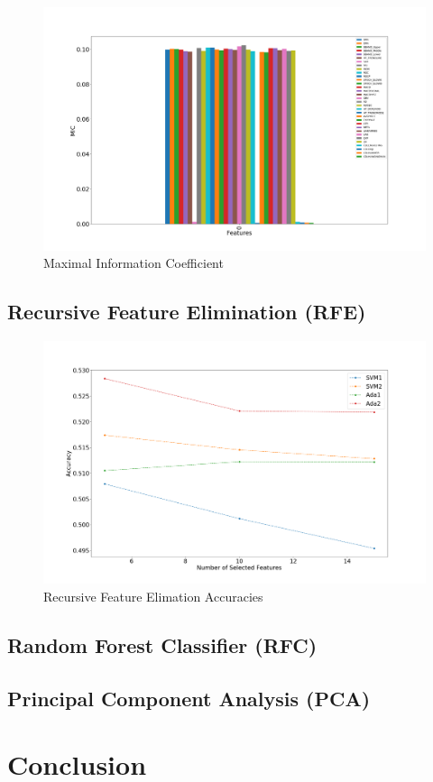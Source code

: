\documentclass{article}\raggedbottom
\begin{document}
\begin{figure}[H]
	\centering
	\includegraphics[width=\linewidth]{data/MICT1.png}
	\caption{Maximal Information Coefficient}
	\label{fig:MIC}
\end{figure}

\subsection{Recursive Feature Elimination (RFE)}


\begin{figure}[h!]
	\centering
	\includegraphics[width=\linewidth]{data/RFE.png}
	\caption{Recursive Feature Elimation Accuracies}
	\label{fig:RFE}
\end{figure}
\subsection{Random Forest Classifier (RFC)}
\subsection{Principal Component Analysis (PCA)}

\section{Conclusion}

 

\end{document}
